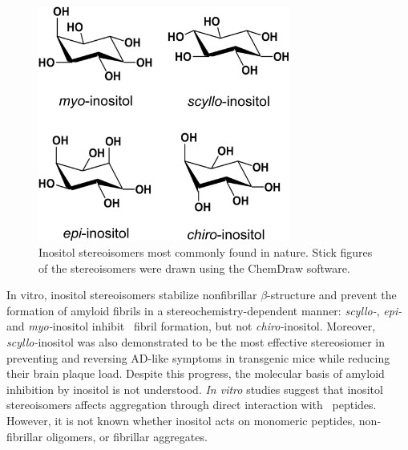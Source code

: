 \begin{figure}[htbp]
  \centering
  \includegraphics[width=3.25in]{figures/results1/GA4_paper_figures_submitted-1}
  \caption[Inositol stereoisomers most commonly found in nature.]
   {Inositol stereoisomers most commonly found in nature. Stick figures of the stereoisomers were drawn using the ChemDraw software.}
   \label{fig:figure1}
\end{figure}

In vitro, inositol stereoisomers stabilize nonfibrillar $\beta$-structure and prevent the formation of amyloid fibrils in a stereochemistry-dependent manner: \textit{scyllo-}, \textit{epi-} and \textit{myo-}inositol inhibit \abeta\ fibril formation, but not \textit{chiro-}inositol.\cite{McLaurin:2000p64,McLaurin:1998p176,Nitz:2008p13,Sun:2008p12,Townsend:2006p44} Moreover, \textit{scyllo-}inositol was also demonstrated to be the most effective stereosiomer in preventing and reversing AD-like symptoms in transgenic mice while reducing their brain plaque load.\cite{McLaurin:2006p29} Despite this progress, the molecular basis of amyloid inhibition by inositol is not understood. \textit{In vitro} studies suggest that inositol stereoisomers affects aggregation through direct interaction with \abeta\ peptides.\cite{McLaurin:1998p176,McLaurin:2000p64,Nitz:2008p13,Sun:2008p12} However, it is not known whether inositol acts on monomeric peptides, non-fibrillar oligomers, or fibrillar aggregates.

